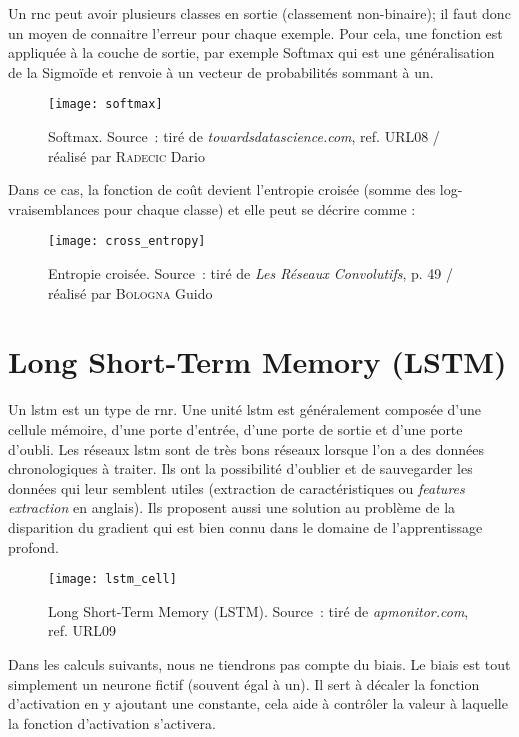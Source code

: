 Un \gls{rnc} peut avoir plusieurs classes en sortie (classement non-binaire); il faut donc un moyen de connaitre l’erreur pour chaque exemple. Pour cela, une fonction est appliquée à la couche de sortie, par exemple Softmax qui est une généralisation de la Sigmoïde et renvoie à un vecteur de probabilités sommant à un.

\begin{figure}[H]
	\centering
	\texttt{[image: softmax]}
	\caption[Softmax]{Softmax. Source : tiré de \textit{towardsdatascience.com}, ref. URL08 / réalisé par \textsc{Radecic} Dario}
	\label{fig:softmax}
\end{figure}

Dans ce cas, la fonction de coût devient l’entropie croisée (somme des log-vraisemblances pour chaque classe) et elle peut se décrire comme :

\begin{figure}[H]
	\centering
	\texttt{[image: cross\_entropy]}
	\caption[Entropie croisée]{Entropie croisée. Source : tiré de \textit{Les Réseaux Convolutifs}, p. 49 / réalisé par \textsc{Bologna} Guido}
	\label{fig:cross_entropy}
\end{figure}

\section{Long Short-Term Memory (LSTM)}
\label{sec:3.7}

Un \gls{lstm} est un type de \gls{rnr}. Une unité \gls{lstm} est généralement composée d’une cellule mémoire, d'une porte d’entrée, d'une porte de sortie et d'une porte d’oubli. Les réseaux \gls{lstm} sont de très bons réseaux lorsque l’on a des données chronologiques à traiter. Ils ont la possibilité d’oublier et de sauvegarder les données qui leur semblent utiles (extraction de caractéristiques ou \textit{features extraction} en anglais). Ils proposent aussi une solution au problème de la disparition du gradient qui est bien connu dans le domaine de l’apprentissage profond.

\begin{figure}[H]
	\centering
	\texttt{[image: lstm\_cell]}
	\caption[Long Short-Term Memory (LSTM)]{Long Short-Term Memory (LSTM). Source : tiré de \textit{apmonitor.com}, ref. URL09}
	\label{fig:lstm_cell}
\end{figure}

Dans les calculs suivants, nous ne tiendrons pas compte du biais. Le biais est tout simplement un neurone fictif (souvent égal à un). Il sert à décaler la fonction d’activation en y ajoutant une constante, cela aide à contrôler la valeur à laquelle la fonction d'activation s'activera.

